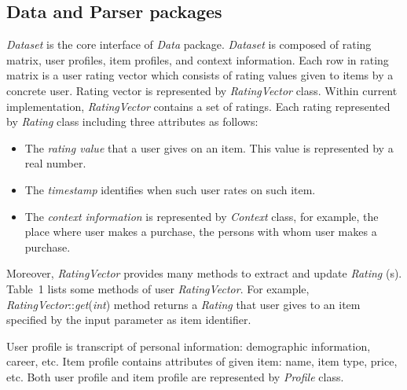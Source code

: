 \documentclass[a4paper]{llncs}
\begin{document}
\subsection{Data and Parser packages}
\label{subsec:data-parser-packages}
\textit{Dataset} is the core interface of \textit{Data} package. \textit{Dataset} is composed of rating matrix, user profiles, item profiles, and context information. Each row in rating matrix is a user rating vector which consists of rating values given to items by a concrete user. Rating vector is represented by \textit{RatingVector} class. Within current implementation, \textit{RatingVector} contains a set of ratings. Each rating represented by \textit{Rating} class including three attributes as follows:
\begin{itemize}
\item The \textit{rating value} that a user gives on an item. This value is represented by a real number.
\item The \textit{timestamp} identifies when such user rates on such item.
\item The \textit{context information} is represented by \textit{Context} class, for example, the place where user makes a purchase, the persons with whom user makes a purchase.
\end{itemize}
Moreover, \textit{RatingVector} provides many methods to extract and update \textit{Rating} (s). Table~1 lists some methods of user \textit{RatingVector}. For example, \textit{RatingVector}::\textit{get}(\textit{int}) method returns a \textit{Rating} that user gives to an item specified by the input parameter as item identifier.

User profile is transcript of personal information: demographic information, career, etc. Item profile contains attributes of given item: name, item type, price, etc. Both user profile and item profile are represented by \textit{Profile} class.
\end{document}
